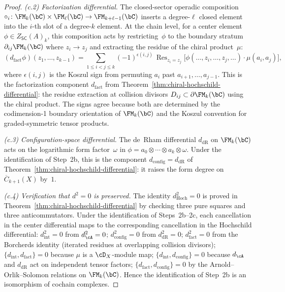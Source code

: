 \begin{proof}
\emph{(c.2) Factorization differential.}
The closed-sector operadic composition
$\circ_i\colon \FM_k(\bC) \times \FM_\ell(\bC) \to
\FM_{k+\ell-1}(\bC)$
inserts a degree-$\ell$ closed element into the $i$-th slot
of a degree-$k$ element. At the chain level, for a center
element $\phi \in Z_{\mathsf{SC}}(A)_k$, this composition acts
by restricting~$\phi$ to the boundary stratum
$\partial_{ij}\FM_k(\bC)$ where $z_i \to z_j$ and extracting the
residue of the chiral product~$\mu$:
\[
(d_{\mathrm{fact}}\phi)(z_1, \ldots, z_{k-1})
= \sum_{1 \leq i < j \leq k}
(-1)^{\epsilon(i,j)}\,
\operatorname{Res}_{z_i = z_j}
\bigl[\phi(\ldots, z_i, \ldots, z_j, \ldots)
\cdot \mu(a_i, a_j)\bigr],
\]
where $\epsilon(i,j)$ is the Koszul sign from permuting $a_i$ past
$a_{i+1}, \ldots, a_{j-1}$. This is the factorization component
$d_{\mathrm{fact}}$ from
Theorem~\ref{thm:chiral-hochschild-differential}: the
residue extraction at collision divisors $D_{ij} \subset
\partial\FM_k(\bC)$ using the chiral product. The signs agree
because both are determined by the codimension-1 boundary
orientation of $\FM_k(\bC)$ and the Koszul convention for
graded-symmetric tensor products.

\emph{(c.3) Configuration-space differential.}
The de~Rham differential $d_{\mathrm{dR}}$ on $\FM_k(\bC)$ acts
on the logarithmic form factor~$\omega$ in
$\phi = a_0 \otimes \cdots \otimes a_k \otimes \omega$. Under
the identification of Step~2b, this is the component
$d_{\mathrm{config}} = d_{\mathrm{dR}}$ of
Theorem~\ref{thm:chiral-hochschild-differential}: it raises
the form degree on $\overline{C}_{k+1}(X)$ by~$1$.

\emph{(c.4) Verification that $d^2 = 0$ is preserved.}
The identity $d_{\mathrm{Hoch}}^2 = 0$ is proved in
Theorem~\ref{thm:chiral-hochschild-differential} by checking
three pure squares and three anticommutators. Under the
identification of Steps~2b--2c, each cancellation in the center
differential maps to the corresponding cancellation in the
Hochschild differential: $d_{\mathrm{int}}^2 = 0$ from
$d_\cA^2 = 0$;
$d_{\mathrm{config}}^2 = 0$ from
$d_{\mathrm{dR}}^2 = 0$;
$d_{\mathrm{fact}}^2 = 0$ from the Borcherds identity
(iterated residues at overlapping collision divisors);
$\{d_{\mathrm{int}}, d_{\mathrm{fact}}\} = 0$
because $\mu$ is a $\cD_X$-module map;
$\{d_{\mathrm{int}}, d_{\mathrm{config}}\} = 0$
because $d_\cA$ and $d_{\mathrm{dR}}$ act on independent tensor
factors;
$\{d_{\mathrm{fact}}, d_{\mathrm{config}}\} = 0$
by the Arnold--Orlik--Solomon relations on $\FM_k(\bC)$.
Hence the identification of Step~2b is an isomorphism of
cochain complexes.


\end{proof}
